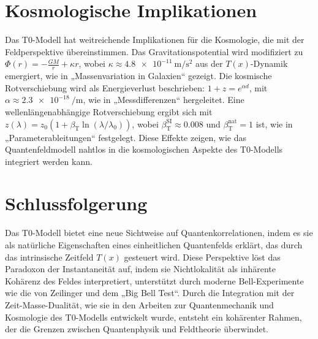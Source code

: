 \documentclass[a4paper,12pt]{article}
\newcommand{\Tfield}{T(x)}
\newcommand{\betaT}{\beta_{\text{T}}}
\theoremstyle{definition}
\theoremstyle{remark}
\begin{document}
	\section{Kosmologische Implikationen}
	
	Das T0-Modell hat weitreichende Implikationen für die Kosmologie, die mit der Feldperspektive übereinstimmen. Das Gravitationspotential wird modifiziert zu \(\Phi(r) = -\frac{G M}{r} + \kappa r\), wobei \(\kappa \approx \SI{4.8e-11}{\meter\per\second\squared}\) aus der \(\Tfield\)-Dynamik emergiert, wie in „Massenvariation in Galaxien“ \cite{pascher_galaxies_2025} gezeigt. Die kosmische Rotverschiebung wird als Energieverlust beschrieben: \(1 + z = e^{\alpha d}\), mit \(\alpha \approx \SI{2.3e-18}{\per\meter}\), wie in „Messdifferenzen“ \cite{pascher_messdifferenzen_2025} hergeleitet. Eine wellenlängenabhängige Rotverschiebung ergibt sich mit \(z(\lambda) = z_0 (1 + \betaT \ln(\lambda/\lambda_0))\), wobei \(\betaT^{\text{SI}} \approx 0.008\) und \(\betaT^{\text{nat}} = 1\) ist, wie in „Parameterableitungen“ \cite{pascher_params_2025} festgelegt. Diese Effekte zeigen, wie das Quantenfeldmodell nahtlos in die kosmologischen Aspekte des T0-Modells integriert werden kann.
	
	\section{Schlussfolgerung}
	
	Das T0-Modell bietet eine neue Sichtweise auf Quantenkorrelationen, indem es sie als natürliche Eigenschaften eines einheitlichen Quantenfelds erklärt, das durch das intrinsische Zeitfeld \(\Tfield\) gesteuert wird. Diese Perspektive löst das Paradoxon der Instantaneität auf, indem sie Nichtlokalität als inhärente Kohärenz des Feldes interpretiert, unterstützt durch moderne Bell-Experimente wie die von Zeilinger und dem „Big Bell Test“. Durch die Integration mit der Zeit-Masse-Dualität, wie sie in den Arbeiten zur Quantenmechanik und Kosmologie des T0-Modells entwickelt wurde, entsteht ein kohärenter Rahmen, der die Grenzen zwischen Quantenphysik und Feldtheorie überwindet.
	
\end{document}
